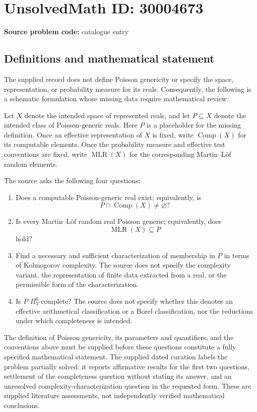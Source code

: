 \documentclass[11pt]{article}
\begin{document}
\section*{UnsolvedMath ID: 30004673}
\textbf{Source problem code:} catalogue entry
\subsection{Definitions and mathematical statement}
The supplied record does not define Poisson genericity or specify the space, representation, or probability measure for its reals. Consequently, the following is a schematic formulation whose missing data require mathematical review.

Let \(X\) denote the intended space of represented reals, and let \(P\subseteq X\) denote the intended class of Poisson-generic reals. Here \(P\) is a placeholder for the missing definition. Once an effective representation of \(X\) is fixed, write \(\operatorname{Comp}(X)\) for its computable elements. Once the probability measure and effective test conventions are fixed, write \(\operatorname{MLR}(X)\) for the corresponding Martin--L\"of random elements.

The source asks the following four questions:
\begin{enumerate}
\item Does a computable Poisson-generic real exist; equivalently, is
\[
P\cap\operatorname{Comp}(X)\ne\varnothing?
\]
\item Is every Martin--L\"of random real Poisson generic; equivalently, does
\[
\operatorname{MLR}(X)\subseteq P
\]
hold?
\item Find a necessary and sufficient characterization of membership in \(P\) in terms of Kolmogorov complexity. The source does not specify the complexity variant, the representation of finite data extracted from a real, or the permissible form of the characterization.
\item Is \(P\) \(\Pi^0_3\)-complete? The source does not specify whether this denotes an effective arithmetical classification or a Borel classification, nor the reductions under which completeness is intended.
\end{enumerate}

The definition of Poisson genericity, its parameters and quantifiers, and the conventions above must be supplied before these questions constitute a fully specified mathematical statement. The supplied dated curation labels the problem partially solved: it reports affirmative results for the first two questions, settlement of the completeness question without stating its answer, and an unresolved complexity-characterization question in the requested form. These are supplied literature assessments, not independently verified mathematical conclusions.
\end{document}
